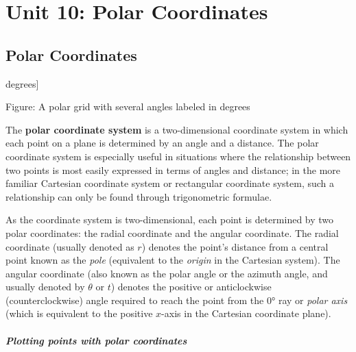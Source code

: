 \chapter{Unit 10: Polar Coordinates}
\label{chap:unit10}

\section{Polar Coordinates}
\label{sec:polar-coordinates}


degrees]



Figure: A polar grid with several angles labeled in degrees



The \textbf{polar coordinate system} is a two-dimensional coordinate system in which each point on a plane is determined by an angle and a distance. The polar coordinate system is especially useful in situations where the relationship between two points is most easily expressed in terms of angles and distance; in the more familiar Cartesian coordinate system or rectangular coordinate system, such a relationship can only be found through trigonometric formulae.



As the coordinate system is two-dimensional, each point is determined by two polar coordinates: the radial coordinate and the angular coordinate. The radial coordinate (usually denoted as $r$) denotes the point's distance from a central point known as the \textit{pole} (equivalent to the \textit{origin} in the Cartesian system). The angular coordinate (also known as the polar angle or the azimuth angle, and usually denoted by $\theta$ or $t$) denotes the positive or anticlockwise (counterclockwise) angle required to reach the point from the 0° ray or \textit{polar axis} (which is equivalent to the positive $x$-axis in the Cartesian coordinate plane).



\paragraph{Plotting points with polar coordinates}



